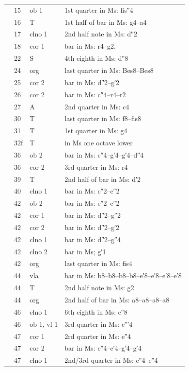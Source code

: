\documentclass[parskip=full]{scrreprt}
\begin{document}
\begin{longtable}{lll L{10cm}}
	  & 15   & ob 1    & 1st quarter in Ms: fis″4 \\
	  & 16   & T       & 1st half of bar in Ms: g4–a4 \\
	  & 17   & clno 1  & 2nd half note in Ms: d″2 \\
	  & 18   & cor 1   & bar in Ms: r4–g2. \\
	  & 22   & S       & 4th eighth in Ms: d″8 \\
	  & 24   & org     & last quarter in Ms: Bes8–Bes8 \\
	  & 25   & cor 2   & bar in Ms: d″2–g′2 \\
	  & 26   & cor 2   & bar in Ms: c″4–r4–r2 \\
	  & 27   & A       & 2nd quarter in Ms: c4 \\
	  & 30   & T       & last quarter in Ms: f8–fis8 \\
	  & 31   & T       & 1st quarter in Ms: g4 \\
	  & 32f  & T       & in Ms one octave lower \\
	  & 36   & ob 2    & bar in Ms: c″4–g′4–g′4–d″4 \\
	  & 36   & cor 2   & 3rd quarter in Ms: r4 \\
	  & 39   & T       & 2nd half of bar in Ms: d′2 \\
	  & 40   & clno 1  & bar in Ms: c″2–c″2 \\
	  & 42   & ob 2    & bar in Ms: e″2–e″2 \\
	  & 42   & cor 1   & bar in Ms: d″2–g″2 \\
	  & 42   & cor 2   & bar in Ms: d″2–g′2 \\
	  & 42   & clno 1  & bar in Ms: d″2–g″4 \\
	  & 42   & clno 2  & bar in Ms; g′1 \\
	  & 42   & org     & last quarter in Ms: fis4 \\
	  & 44   & vla     & bar in Ms: b8–b8–b8–b8–e′8–e′8–e′8–e′8 \\
	  & 44   & T       & 2nd half note in Ms: g2 \\
	  & 44   & org     & 2nd half of bar in Ms: a8–a8–a8–a8 \\
	  & 46   & clno 1  & 6th eighth in Ms: e″8 \\
	  & 46   & ob 1, vl 1 & 3rd quarter in Ms: c′′′4 \\
	  & 47   & cor 1   & 2rd quarter in Ms: e″4 \\
	  & 47   & cor 2   & bar in Ms: c″4–e′4–g′4–g′4 \\
	  & 47   & clno 1  & 2nd/3rd quarter in Ms: c″4–e″4 \\

\end{longtable}
\end{document}
